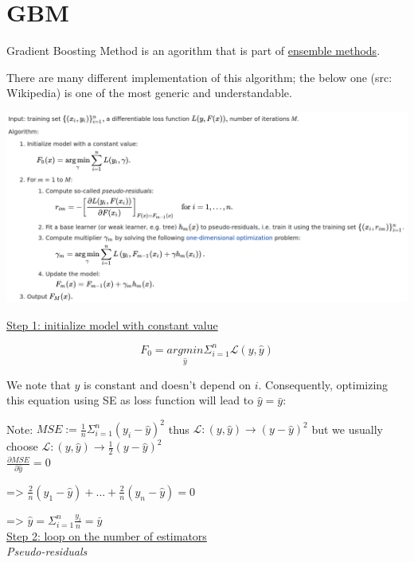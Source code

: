 \section*{GBM}

Gradient Boosting Method is an agorithm that is part of \hyperref[sec:ensemble-methods]{ensemble methods}.

There are many different implementation of this algorithm; the below one (src: Wikipedia) is one of the most generic and understandable.

\begin{center}
\includegraphics[scale=0.3]{GBM_algo.png}
\end{center}

\underline{Step 1: initialize model with constant value}

$$F_0 = \underset{\hat y}{argmin} \Sigma_{i=1}^n \mathcal{L}(y,\hat y)$$

We note that $\hat y$ is constant and doesn't depend on $i$. Consequently, optimizing this equation using SE as loss function will lead to $\hat y = \bar y$:

Note: $MSE := \frac{1}{n}\Sigma_{i=1}^n (y_i - \hat y)^2$ thus $\mathcal{L}: (y,\hat y) \to (y-\hat y)^2$ but we usually choose $\mathcal{L}: (y,\hat y) \to \frac{1}{2}(y-\hat y)^2$\\

$\frac{\partial MSE}{\partial \hat y} = 0$

=> $\frac{2}{n}(y_1 - \hat y) + ... + \frac{2}{n}(y_n - \hat y) = 0$

=> $\hat y = \Sigma_{i=1}^n \frac{y_i}{n} = \bar y$ \\

\underline{Step 2: loop on the number of estimators} \\

\textit{Pseudo-residuals} \\

